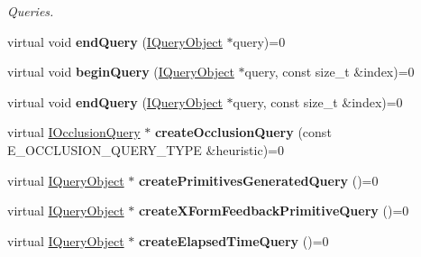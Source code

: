 \begin{DoxyCompactItemize}
\begin{DoxyCompactList}\small\item\em Queries. \end{DoxyCompactList}\item 
virtual void {\bfseries end\+Query} (\hyperlink{classirr_1_1video_1_1IQueryObject}{I\+Query\+Object} $\ast$query)=0\hypertarget{classirr_1_1video_1_1IVideoDriver_ac73bd1ad0502d6010edd95db52fdbb90}{}\label{classirr_1_1video_1_1IVideoDriver_ac73bd1ad0502d6010edd95db52fdbb90}

\item 
virtual void {\bfseries begin\+Query} (\hyperlink{classirr_1_1video_1_1IQueryObject}{I\+Query\+Object} $\ast$query, const size\+\_\+t \&index)=0\hypertarget{classirr_1_1video_1_1IVideoDriver_a88af402abf5273aa277f888f526430b9}{}\label{classirr_1_1video_1_1IVideoDriver_a88af402abf5273aa277f888f526430b9}

\item 
virtual void {\bfseries end\+Query} (\hyperlink{classirr_1_1video_1_1IQueryObject}{I\+Query\+Object} $\ast$query, const size\+\_\+t \&index)=0\hypertarget{classirr_1_1video_1_1IVideoDriver_a2c58e5c0bf72f153306eca4c4e427f26}{}\label{classirr_1_1video_1_1IVideoDriver_a2c58e5c0bf72f153306eca4c4e427f26}

\item 
virtual \hyperlink{classirr_1_1video_1_1IOcclusionQuery}{I\+Occlusion\+Query} $\ast$ {\bfseries create\+Occlusion\+Query} (const E\+\_\+\+O\+C\+C\+L\+U\+S\+I\+O\+N\+\_\+\+Q\+U\+E\+R\+Y\+\_\+\+T\+Y\+PE \&heuristic)=0\hypertarget{classirr_1_1video_1_1IVideoDriver_a1e20c5d721d84428cfcd92b849aa8fe5}{}\label{classirr_1_1video_1_1IVideoDriver_a1e20c5d721d84428cfcd92b849aa8fe5}

\item 
virtual \hyperlink{classirr_1_1video_1_1IQueryObject}{I\+Query\+Object} $\ast$ {\bfseries create\+Primitives\+Generated\+Query} ()=0\hypertarget{classirr_1_1video_1_1IVideoDriver_a94828950c426987af5fef58924474d96}{}\label{classirr_1_1video_1_1IVideoDriver_a94828950c426987af5fef58924474d96}

\item 
virtual \hyperlink{classirr_1_1video_1_1IQueryObject}{I\+Query\+Object} $\ast$ {\bfseries create\+X\+Form\+Feedback\+Primitive\+Query} ()=0\hypertarget{classirr_1_1video_1_1IVideoDriver_a750c25703eb080d45a966d34a24aa227}{}\label{classirr_1_1video_1_1IVideoDriver_a750c25703eb080d45a966d34a24aa227}

\item 
virtual \hyperlink{classirr_1_1video_1_1IQueryObject}{I\+Query\+Object} $\ast$ {\bfseries create\+Elapsed\+Time\+Query} ()=0\hypertarget{classirr_1_1video_1_1IVideoDriver_a4c5180420fa55523508c335a416048b4}{}\label{classirr_1_1video_1_1IVideoDriver_a4c5180420fa55523508c335a416048b4}


\end{DoxyCompactItemize}
